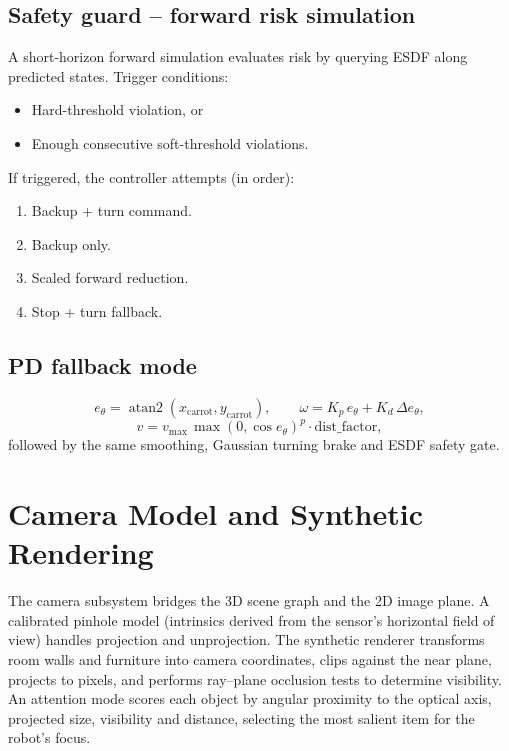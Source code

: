 \documentclass[a4paper, 11pt]{article}
\DeclareMathOperator{\atantwo}{atan2}
\begin{document}
\subsection{Safety guard -- forward risk simulation}

A short-horizon forward simulation evaluates risk by querying ESDF along
predicted states.  Trigger conditions:
\begin{itemize}
  \item Hard-threshold violation, or
  \item Enough consecutive soft-threshold violations.
\end{itemize}

If triggered, the controller attempts (in order):
\begin{enumerate}
  \item Backup + turn command.
  \item Backup only.
  \item Scaled forward reduction.
  \item Stop + turn fallback.
\end{enumerate}

\subsection{PD fallback mode}

\begin{equation}
  e_\theta = \atantwo(x_{\text{carrot}}, y_{\text{carrot}}),
  \qquad
  \omega = K_p\,e_\theta + K_d\,\Delta e_\theta,
\end{equation}
\begin{equation}
  v = v_{\max}\,\max(0, \cos e_\theta)^p \cdot
      \text{dist\_factor},
\end{equation}
followed by the same smoothing, Gaussian turning brake and ESDF safety
gate.

\section{Camera Model and Synthetic Rendering}\label{sec:camera}

The camera subsystem bridges the 3D scene graph and the 2D image
plane.  A calibrated pinhole model (intrinsics derived from the
sensor's horizontal field of view) handles projection and
unprojection.  The synthetic renderer transforms room walls and
furniture into camera coordinates, clips against the near plane,
projects to pixels, and performs ray--plane occlusion tests to
determine visibility.  An attention mode scores each object by
angular proximity to the optical axis, projected size, visibility
and distance, selecting the most salient item for the robot's focus.
\end{document}
